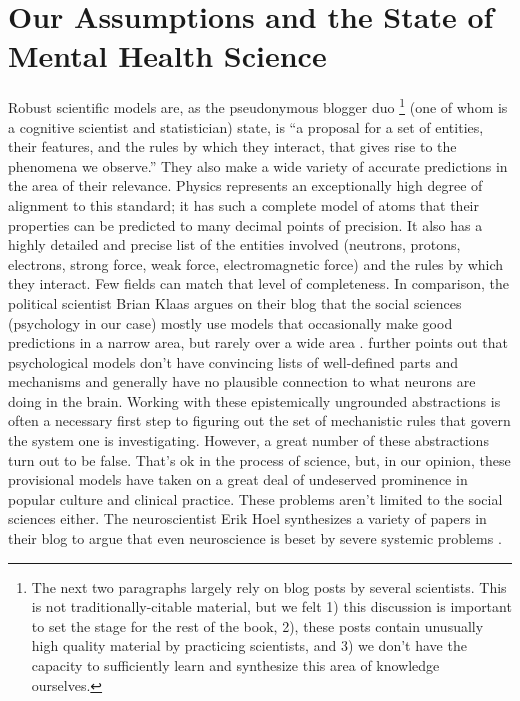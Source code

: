 \documentclass[12pt,letterpaper]{book}
\begin{document}
\section{Our Assumptions and the State of Mental Health Science}
\label{sec:assumptions}
Robust scientific models are, as the pseudonymous blogger duo \footnote{The next two paragraphs largely rely on blog posts by several scientists. This is not traditionally-citable material, but we felt 1) this discussion is important to set the stage for the rest of the book, 2), these posts contain unusually high quality material by practicing scientists, and 3) we don't have the capacity to sufficiently learn and synthesize this area of knowledge ourselves.} \textcite{mechanisticModels} (one of whom is a cognitive scientist and statistician) state, is “a proposal for a set of entities, their features, and the rules by which they interact, that gives rise to the phenomena we observe.” They also make a wide variety of accurate predictions in the area of their relevance. Physics represents an exceptionally high degree of alignment to this standard; it has such a complete model of atoms that their properties can be predicted to many decimal points of precision. It also has a highly detailed and precise list of the entities involved (neutrons, protons, electrons, strong force, weak force, electromagnetic force) and the rules by which they interact. Few fields can match that level of completeness. In comparison, the political scientist Brian Klaas argues on their blog that the social sciences (psychology in our case) mostly use models that occasionally make good predictions in a narrow area, but rarely over a wide area \cite{zombieSocialScience}. \textcite{mechanisticModels} further points out that psychological models don't have convincing lists of well-defined parts and mechanisms and generally have no plausible connection to what neurons are doing in the brain. Working with these epistemically ungrounded abstractions is often a necessary first step to figuring out the set of mechanistic rules that govern the system one is investigating. However, a great number of these abstractions turn out to be false. That’s ok in the process of science, but, in our opinion, these provisional models have taken on a great deal of undeserved prominence in popular culture and clinical practice. These problems aren't limited to the social sciences either. The neuroscientist Erik Hoel synthesizes a variety of papers in their blog to argue that even neuroscience is beset by severe systemic problems \cite{hoelNeuroscience}.
\end{document}
